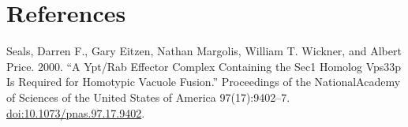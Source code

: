 \documentclass[12pt,twoside]{reedthesis}
\begin{document}
\backmatter

\chapter*{References}\label{references}


\noindent 

\setlength{\parindent}{-0.20in}

Seals, Darren F., Gary Eitzen, Nathan Margolis, William T. Wickner, and Albert Price. 2000. ``A Ypt/Rab Effector Complex Containing the Sec1 Homolog Vps33p Is Required for Homotypic Vacuole Fusion.'' Proceedings of the NationalAcademy of Sciences of the United States of America 97(17):9402--7. \url{doi:10.1073/pnas.97.17.9402}.
\end{document}
